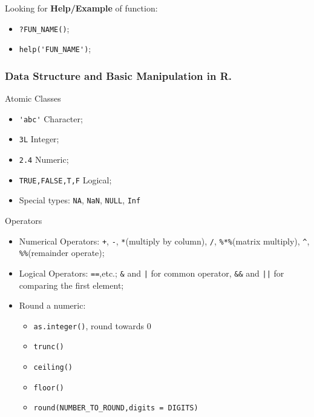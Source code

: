 \begin{point}
    Looking for \textbf{Help/Example}  of function:
\end{point}

\begin{itemize}[topsep=2pt,itemsep=0pt]
    \item \lstinline|?FUN_NAME()|;
    \item \lstinline|help('FUN_NAME')|;
\end{itemize}

\subsubsection{Data Structure and Basic Manipulation in R.}

\begin{point}
    Atomic Classes
\end{point}
\begin{itemize}[topsep=2pt,itemsep=0pt]
    \item \lstinline|'abc'| Character;
    \item \lstinline|3L| Integer;
    \item \lstinline|2.4| Numeric;
    \item \lstinline|TRUE,FALSE,T,F| Logical;
    \item Special types: \lstinline|NA|, \lstinline|NaN|, \lstinline|NULL|, \lstinline|Inf|
\end{itemize}

\begin{point}
    Operators
\end{point}
\begin{itemize}[topsep=2pt,itemsep=0pt]
    \item Numerical Operators: \lstinline|+|, \lstinline|-|, \lstinline|*|(multiply by column), \lstinline|/|, \lstinline|%*%|(matrix multiply), \lstinline|^|, \lstinline|%%|(remainder operate);
    \item Logical Operators: \lstinline|==|,etc.; \lstinline|&| and \lstinline{|} for common operator, \lstinline|&&| and \lstinline{||} for comparing the first element;
    \item Round a numeric:
    \begin{itemize}[topsep=2pt,itemsep=0pt]
        \item \lstinline|as.integer()|, round towards 0
        \item \lstinline|trunc()|
        \item \lstinline|ceiling()|
        \item \lstinline|floor()|
        \item \lstinline|round(NUMBER_TO_ROUND,digits = DIGITS)|
    \end{itemize}
\end{itemize}

